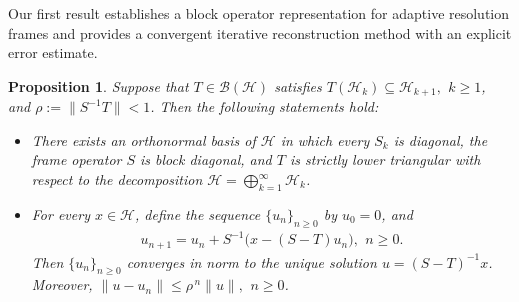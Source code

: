 \documentclass[10pt,a4paper]{amsart}
\newtheorem{prop}[thm]{Proposition}
\begin{document}
Our first result establishes a block operator representation for
adaptive resolution frames and provides a convergent iterative
reconstruction method with an explicit error estimate.

\begin{prop} \label{Prop.1}
Suppose that $T\in\mathcal B(\mathcal H)$ satisfies $T(\mathcal
H_k)\subseteq\mathcal H_{k+1}, \,\ k\ge1$, and
$\rho:=\|S^{-1}T\|<1$. Then the following statements hold:
\begin{itemize}
\item[(i)] There exists an orthonormal basis of $\mathcal H$ in
which every $S_k$ is diagonal, the frame operator $S$ is block
diagonal, and $T$ is strictly lower triangular with respect to the
decomposition $\mathcal H=\bigoplus_{k=1}^{\infty}\mathcal H_k$.

\item[(ii)] For every $x\in\mathcal H$, define the sequence
$\{u_n\}_{n\ge0}$ by $u_0=0$, and
\begin{eqnarray} \label{eqn-90}
u_{n+1} = u_n + S^{-1}\bigl(x-(S-T)u_n\bigr), \,\ n\ge0.
\end{eqnarray}
Then $\{u_n\}_{n\geq 0}$ converges in norm to the unique solution
$u=(S-T)^{-1}x$. Moreover, $\|u-u_n\| \le \rho^{\,n}\|u\|, \,\
n\ge0$.
\end{itemize}
\end{prop}
\end{document}
